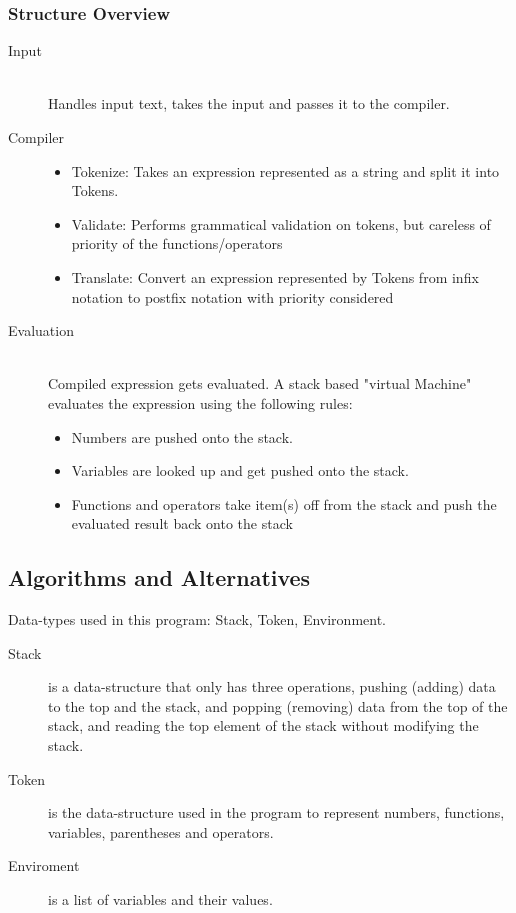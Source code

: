 \documentclass[12pt,a4paper]{article}
\begin{document}
\subsubsection{Structure Overview}
\begin{description}
  \item [Input] \hfill \\Handles input text, takes the input and passes it to the compiler.
  \item [Compiler] \hfill
  \begin{itemize}
    \item Tokenize: Takes an expression represented as a string and split it into Tokens.
    \item Validate: Performs grammatical validation on tokens, but careless of priority of the functions/operators \change
    \item Translate: Convert an expression represented by Tokens from infix notation to postfix notation with priority considered \change
  \end{itemize}    
  \item [Evaluation] \hfill \\ Compiled expression gets evaluated. A stack based "virtual Machine" evaluates the expression using the following rules:
  \begin {itemize}
    \item Numbers are pushed onto the stack.
    \item Variables are looked up and get pushed onto the stack.
    \item Functions and operators take item(s) off from the stack and push the evaluated result back onto the stack
  \end {itemize}
\end{description}


\iffalse
En mer detaljerad beskrivning (design)
- Vilka delar består systemet av? Hur samverkar de för att lösa problemet?

- Vilka datastrukturer används? Beskriv abstrakta datatyper (gränssnitt/interface)
\fi
\newpage
\subsection{Algorithms and Alternatives}
\textnormal{ Data-types used in this program: Stack, Token, Environment.}
\begin{description}
  \item [Stack] is a data-structure that only has three operations, pushing (adding) data to the top and the stack, and popping (removing) 
  data from the top of the stack, and reading the top element of the stack without modifying the stack.

  \item[Token] is the data-structure used in the program to represent numbers, functions, variables, parentheses and operators.

  \item[Enviroment] is a list of variables and their values.
\end{description}
\end{document}
